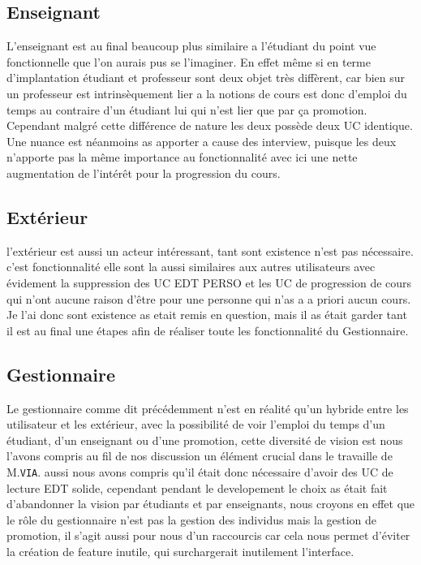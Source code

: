 \documentclass[a4paper,french,final]{memoir}
\begin{document}
\subsection{Enseignant}
L'enseignant est au final beaucoup plus similaire a l'étudiant du point vue fonctionnelle que l'on aurais pus se l'imaginer. En effet même si en terme d'implantation
étudiant et professeur sont deux objet très diffèrent, car bien sur un professeur est intrinsèquement lier a la notions de cours est donc d'emploi du temps au contraire
d'un étudiant lui qui n'est lier que par ça promotion.
Cependant malgré cette différence de  nature les deux possède deux UC identique. Une nuance est néanmoins as apporter a cause des interview, puisque les deux n'apporte
pas la même importance au fonctionnalité avec ici une nette augmentation de l'intérêt pour la progression du cours.
\begin{center}
    
\end{center}
\subsection{Extérieur}
\begin{center}
    
\end{center}
l'extérieur est aussi un acteur intéressant, tant sont existence n'est pas nécessaire. c'est fonctionnalité elle sont la aussi similaires aux autres utilisateurs
avec évidement la suppression des UC EDT PERSO et les UC de progression de cours qui n'ont aucune raison d'être pour une personne qui n'as a a priori aucun cours.
Je l'ai donc sont existence as etait remis en question, mais il as était garder tant il est au final une étapes afin de réaliser toute les fonctionnalité du Gestionnaire.
\subsection{Gestionnaire}
\begin{center}
    
\end{center}
Le gestionnaire comme dit précédemment n'est en réalité qu'un hybride entre les utilisateur et les extérieur, avec la possibilité de voir l'emploi du temps d'un étudiant,
d'un enseignant ou d'une promotion, cette diversité de vision est nous l'avons compris au fil de nos discussion un élément crucial dans le travaille de M.\texttt{VIA}.
aussi nous avons compris qu'il était donc nécessaire d'avoir des UC de lecture EDT solide, cependant pendant le developement le choix as était fait d'abandonner la vision
par étudiants et par enseignants, nous croyons en effet que le rôle du gestionnaire n'est pas la gestion des individus mais la gestion de promotion, il s'agit aussi pour
nous d'un raccourcis car cela nous permet d'éviter la création de feature inutile, qui surchargerait inutilement l'interface.
\end{document}
